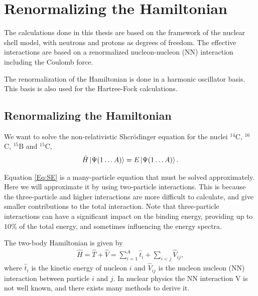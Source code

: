 \newcommand{\h}{\hat{H}}
\newcommand{\he}{\hat{H}_{\textrm{eff}}}
\renewcommand{\H}{\hat{\mathscr{H}}}
\renewcommand{\v}{\hat{V}}
\newcommand{\vv}{\hat{\tilde{V}}}
\renewcommand{\t}{\hat{T}}
\newcommand{\ve}{\hat{V}_{\textrm{eff}}}
\renewcommand{\u}{\hat{U}}
\newcommand{\p}{\hat{P}}
\newcommand{\q}{\hat{Q}}
\newcommand{\qq}{\hat{\tilde{Q}}}
\newcommand{\g}{\hat{G}}
\renewcommand{\gg}{\hat{\tilde{G}}}
\newcommand{\e}{\hat{e}}
\renewcommand{\o}{\hat{\Omega}}
\newcommand{\x}{\hat{X}}
\renewcommand{\u}{\hat{U}}
\newcommand{\w}{\hat{w}}
\renewcommand{\a}{\hat{A}}
\renewcommand{\b}{\hat{B}}
\chapter{Renormalizing the Hamiltonian}

The calculations done in this thesis are based on the framework of the nuclear
shell model, with neutrons and protons as degrees of freedom. The effective
interactions are based on a renormalized nucleon-nucleon (NN) interaction
including the Coulomb force.

The renormalization of the Hamiltonian is done in a harmonic oscillator basis.
This basis is also used for the Hartree-Fock calculations.

\section{Renormalizing the Hamiltonian}

We want to solve the non-relativistic Shcr\"{o}dinger equation for the nuclei
$^{14}$C, $^{16}$C, $^{15}$B and $^{15}$C,
\begin{align}
	\h\ket{\Psi(1\dots A)} = E\ket{\Psi(1\dots A)}.
	\label{Eq:SE}
\end{align}

Equation \ref{Eq:SE} is a many-particle equation that must be solved
approximately. Here we will approximate it by using two-particle interactions.
This is because the three-particle and higher interactions are more difficult
to calculate, and give smaller contributions to the total interaction. 
Note that three-particle interactions can have a significant impact on the
binding energy, providing up to $10\%$ of the total energy, and sometimes
influencing the energy spectra.

The two-body Hamiltonian is given by
\begin{align}
	\h = \t + \v = \sum_{i=1}^A\hat t_i + \sum_{i<j}\v_{ij},
	\label{eq:Ham}
\end{align}
where $\hat t_i$ is the kinetic energy of nucleon $i$ and $\v_{ij}$ is
the nucleon nucleon (NN) interaction between particle $i$ and $j$. In nuclear
physics the NN interaction V is not well known, and there exists many methods
to derive it.

